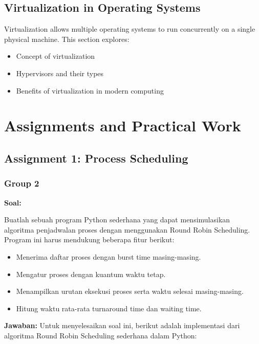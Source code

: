 \documentclass[12pt]{article}
\begin{document}
\subsection{Virtualization in Operating Systems}
Virtualization allows multiple operating systems to run concurrently on a single physical machine. This section explores:
\begin{itemize}
    \item Concept of virtualization
    \item Hypervisors and their types
    \item Benefits of virtualization in modern computing
\end{itemize}

\section{Assignments and Practical Work}
\subsection{Assignment 1: Process Scheduling}
\subsubsection{Group 2}
\textbf{Soal:}
    \par Buatlah sebuah program Python sederhana yang dapat mensimulasikan algoritma penjadwalan proses dengan menggunakan Round Robin Scheduling. Program ini harus mendukung beberapa fitur berikut:
    \begin{itemize} 
    \item Menerima daftar proses dengan burst time masing-masing.
    \item Mengatur proses dengan kuantum waktu tetap.
    \item Menampilkan urutan eksekusi proses serta waktu selesai masing-masing.
    \item Hitung waktu rata-rata turnaround time dan waiting time.
    \end{itemize}

\textbf{Jawaban:}
    Untuk menyelesaikan soal ini, berikut adalah implementasi dari algoritma Round Robin Scheduling sederhana dalam Python:
\end{document}
